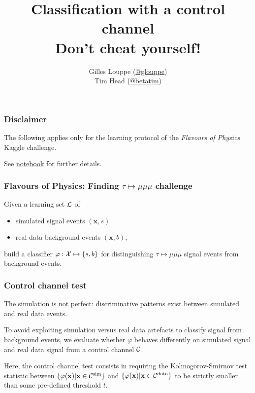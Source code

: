 \documentclass{beamer}
\title{{\bf Classification with a control channel}\\
Don't cheat yourself!}
\author{
Gilles Louppe (\href{https://twitter.com/glouppe}{@glouppe}) \\
Tim Head (\href{https://twitter.com/betatim}{@betatim}) \\
}
\date{}
\begin{document}
\begin{frame}[plain]
\titlepage
\end{frame}

\begin{frame}
  \frametitle{Disclaimer}

The following applies {\color{red} only} for the learning protocol of the {\it
Flavours of Physics} Kaggle challenge.

\vspace{1cm}

See \href{https://github.com/glouppe/notebooks/blob/master/Classification\%20with\%20a\%20control\%20channel.ipynb}{notebook} for further details.

\end{frame}

\begin{frame}
  \frametitle{Flavours of Physics: Finding $\tau \mapsto \mu\mu\mu$ challenge}

Given a learning set ${\cal L}$ of

\vspace{0.5cm}

 \begin{itemize}
 \item simulated signal events $(\mathbf{x}, s)$
 \item real data background events $(\mathbf{x}, b)$,
 \end{itemize}

\vspace{0.5cm}

build a classifier $\varphi : {\cal X} \mapsto \{s, b\}$ for distinguishing
$\tau \mapsto \mu\mu\mu$ signal events from background events.

\end{frame}

\begin{frame}
  \frametitle{Control channel test}

The simulation is not perfect: {\color{red} discriminative patterns exist
between simulated and real data events}.

\vspace{1cm}

To avoid exploiting simulation versus real data artefacts to
classify signal from background events, we {\color{blue}evaluate whether $\varphi$ behaves
differently on simulated signal and real data signal from a control channel
${\cal C}$}.

\vspace{1cm}

Here, the control channel test consists in requiring the Kolmogorov-Smirnov
test statistic between $\{ \varphi(\mathbf{x}) | \mathbf{x} \in {\cal
C}^\text{sim} \}$ and $\{ \varphi(\mathbf{x}) | \mathbf{x} \in {\cal
C}^\text{data} \}$ to be strictly smaller than some pre-defined threshold $t$.

\end{frame}
\end{document}
